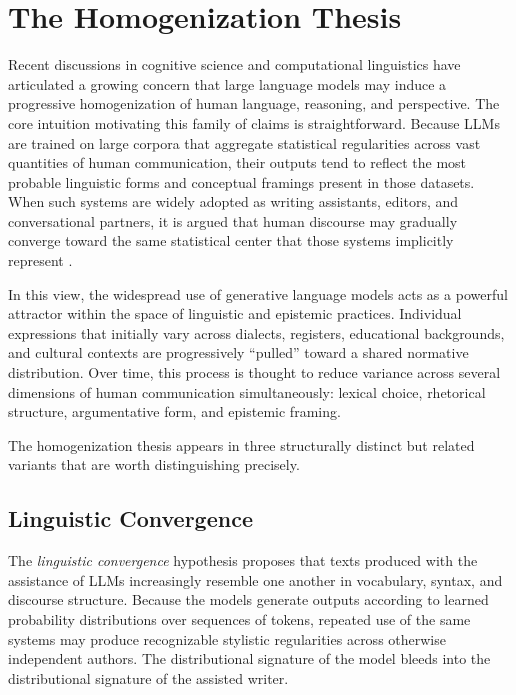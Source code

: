 \documentclass[12pt,a4paper]{article}
\theoremstyle{definition}
\theoremstyle{plain}
\theoremstyle{remark}
\begin{document}
\section{The Homogenization Thesis}
\label{sec:homogenization}

Recent discussions in cognitive science and computational linguistics have articulated a
growing concern that large language models may induce a progressive homogenization of human
language, reasoning, and perspective. The core intuition motivating this family of claims is
straightforward. Because LLMs are trained on large corpora that aggregate statistical
regularities across vast quantities of human communication, their outputs tend to reflect the
most probable linguistic forms and conceptual framings present in those datasets. When such
systems are widely adopted as writing assistants, editors, and conversational partners, it is
argued that human discourse may gradually converge toward the same statistical center that
those systems implicitly represent \citep{sourati2026}.

In this view, the widespread use of generative language models acts as a powerful attractor
within the space of linguistic and epistemic practices. Individual expressions that initially
vary across dialects, registers, educational backgrounds, and cultural contexts are
progressively ``pulled'' toward a shared normative distribution. Over time, this process is
thought to reduce variance across several dimensions of human communication simultaneously:
lexical choice, rhetorical structure, argumentative form, and epistemic framing.

The homogenization thesis appears in three structurally distinct but related variants that
are worth distinguishing precisely.

\subsection{Linguistic Convergence}

The \emph{linguistic convergence} hypothesis proposes that texts produced with the assistance
of LLMs increasingly resemble one another in vocabulary, syntax, and discourse structure.
Because the models generate outputs according to learned probability distributions over
sequences of tokens, repeated use of the same systems may produce recognizable stylistic
regularities across otherwise independent authors. The distributional signature of the model
bleeds into the distributional signature of the assisted writer.
\end{document}
